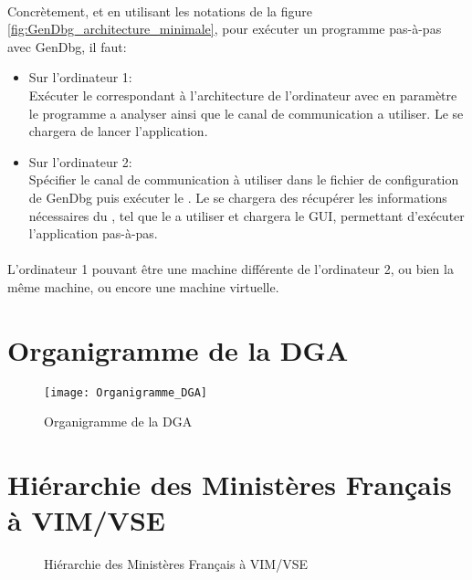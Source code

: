 \documentclass[11pt, book, english, french, standardlists]{upmethodology-document}
\begin{document}
					\paragraph*{}
						Concrètement, et en utilisant les notations de la figure \ref{fig:GenDbg_architecture_minimale}, pour exécuter un programme pas-à-pas avec GenDbg, il faut:
						\begin{itemize}
							\item Sur l'ordinateur 1:\\
								Exécuter le  correspondant à l'architecture de l'ordinateur avec en paramètre le programme a analyser ainsi que le canal de communication a utiliser. Le  se chargera de lancer l'application.
							\item Sur l'ordinateur 2:\\
								Spécifier le canal de communication à utiliser dans le fichier de configuration de GenDbg puis exécuter le \gen{Framework}. Le  se chargera des récupérer les informations nécessaires du , tel que le  a utiliser et chargera le \gls{GUI}, permettant d'exécuter l'application pas-à-pas.
						\end{itemize}
					\paragraph*{}
						L'ordinateur 1 pouvant être une machine différente de l'ordinateur 2, ou bien la même machine, ou encore une machine virtuelle.
	\nocite{*}
	
	
	\printglossary[type=\acronymtype,title=Lexique,toctitle=Lexique]{}
		\setcounter{section}{0}
		\renewcommand{\thesection}{\Alph{section}}
		\renewcommand{\theHsection}{appendixsection.\Alph{section}}
		\section{Organigramme de la DGA}\label{sec:organigrammedga}
			\begin{figure}[H]
				\centering
				\texttt{[image: Organigramme\_DGA]}
				\caption{Organigramme de la DGA\cite{OrganigrammeDGA}}
				\label{fig:Organigramme_DGA}
			\end{figure}
		\section{Hiérarchie des Ministères Français à VIM/VSE}\label{sec:hierarchieministereavim}
			\begin{figure}[H]
				\centering
				\caption{Hiérarchie des Ministères Français à VIM/VSE}
				\label{fig:Hiérarchie_Ministères_à_VIM}
			\end{figure}
\end{document}
